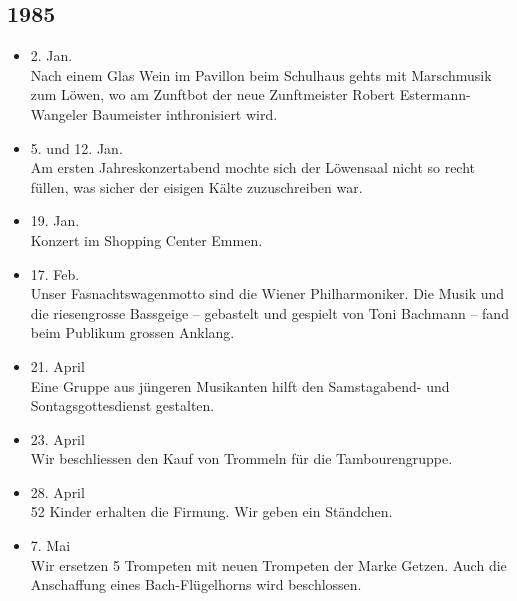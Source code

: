 \subsection*{1985}

\begin{history}


    \begin{itemize}

        \item 2. Jan.\\
              Nach einem Glas Wein im Pavillon beim Schulhaus gehts mit Marschmusik
              zum Löwen, wo am Zunftbot der neue Zunftmeister Robert
              Estermann-Wangeler Baumeister inthronisiert wird.

        \item 5. und 12. Jan.\\
              Am ersten Jahreskonzertabend mochte sich der Löwensaal nicht so recht
              füllen, was sicher der eisigen Kälte zuzuschreiben war.

        \item 19. Jan.\\
              Konzert im Shopping Center Emmen.

        \item 17. Feb.\\
              Unser Fasnachtswagenmotto sind die Wiener Philharmoniker. Die Musik und
              die riesengrosse Bassgeige -- gebastelt und gespielt von Toni Bachmann
              -- fand beim Publikum grossen Anklang.

        \item 21. April\\
              Eine Gruppe aus jüngeren Musikanten hilft den Samstagabend- und
              Sontagsgottesdienst gestalten.

        \item 23. April\\
              Wir beschliessen den Kauf von Trommeln für die Tambourengruppe.

        \item 28. April\\
              52 Kinder erhalten die Firmung. Wir geben ein Ständchen.

        \item 7. Mai\\
              Wir ersetzen 5 Trompeten mit neuen Trompeten der Marke Getzen. Auch die
              Anschaffung eines Bach-Flügelhorns wird beschlossen.


\end{itemize}
\end{history}
